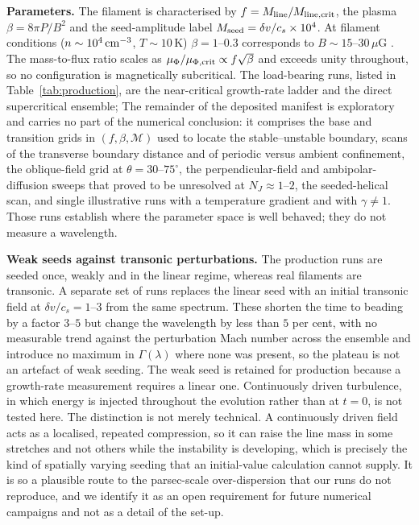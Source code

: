 \documentclass[usenatbib,twoside,twocolumn]{mnras}
\begin{document}
\smallskip\noindent\textbf{Parameters.} The filament is characterised by $f=M_{\rm line}/M_{\rm line,crit}$, the plasma $\beta=8\pi P/B^2$ and the seed-amplitude label $M_{\rm seed}=\delta v/c_s\times10^{4}$. At filament conditions ($n\sim10^4\,{\rm cm^{-3}}$, $T\sim10$\,K) $\beta=1$--$0.3$ corresponds to $B\sim15$--$30\,\mu$G \citep{Crutcher2012}. The mass-to-flux ratio scales as $\mu_\Phi/\mu_{\Phi,\rm crit}\propto f\sqrt{\beta}$ and exceeds unity throughout, so no configuration is magnetically subcritical. The load-bearing runs, listed in Table~\ref{tab:production}, are the near-critical growth-rate ladder and the direct supercritical ensemble; The remainder of the deposited manifest is exploratory and carries no part of the numerical conclusion: it comprises the base and transition grids in $(f,\beta,\mathcal{M})$ used to locate the stable--unstable boundary, scans of the transverse boundary distance and of periodic versus ambient confinement, the oblique-field grid at $\theta=30$--$75^\circ$, the perpendicular-field and ambipolar-diffusion sweeps that proved to be unresolved at $N_J\approx1$--$2$, the seeded-helical scan, and single illustrative runs with a temperature gradient and with $\gamma\neq1$. Those runs establish where the parameter space is well behaved; they do not measure a wavelength.

\smallskip\noindent\textbf{Weak seeds against transonic perturbations.} The production runs are seeded once, weakly and in the linear regime, whereas real filaments are transonic. A separate set of runs replaces the linear seed with an initial transonic field at $\delta v/c_s=1$--$3$ from the same spectrum. These shorten the time to beading by a factor $3$--$5$ but change the wavelength by less than $5$ per cent, with no measurable trend against the perturbation Mach number across the ensemble and introduce no maximum in $\Gamma(\lambda)$ where none was present, so the plateau is not an artefact of weak seeding. The weak seed is retained for production because a growth-rate measurement requires a linear one. Continuously driven turbulence, in which energy is injected throughout the evolution rather than at $t=0$, is not tested here. The distinction is not merely technical. A continuously driven field acts as a localised, repeated compression, so it can raise the line mass in some stretches and not others while the instability is developing, which is precisely the kind of spatially varying seeding that an initial-value calculation cannot supply. It is so a plausible route to the parsec-scale over-dispersion that our runs do not reproduce, and we identify it as an open requirement for future numerical campaigns and not as a detail of the set-up.
\end{document}
